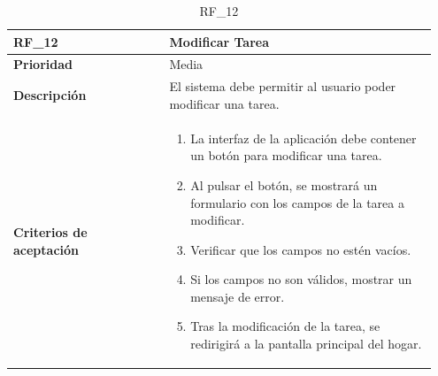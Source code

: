 \begin{table}[htb!]
    \begin{tabular}{|p{0.35\linewidth}|p{0.6\linewidth}|}
        \hline
        \rowcolor[HTML]{C0C0C0}  
        \textbf{RF\_12} & \textbf{Modificar Tarea} \\
        \hline
        \textbf{Prioridad} & Media \\
        \hline
        \textbf{Descripción} & El sistema debe permitir al usuario poder modificar una tarea.  \\
        \hline
        \vspace{0.5mm}
        \textbf{Criterios de aceptación} & 
        \begin{minipage}[t]{0.9\linewidth}
            \begin{enumerate}
                \item La interfaz de la aplicación debe contener un botón para modificar una tarea.
                \item Al pulsar el botón, se mostrará un formulario con los campos de la tarea a modificar.
                \item Verificar que los campos no estén vacíos.
                \item Si los campos no son válidos, mostrar un mensaje de error.
                \item Tras la modificación de la tarea, se redirigirá a la pantalla principal del hogar.
            \end{enumerate}
            \vspace{2mm}
        \end{minipage} \\
        \hline
    \end{tabular}
    \caption{RF\_12}

\end{table}


